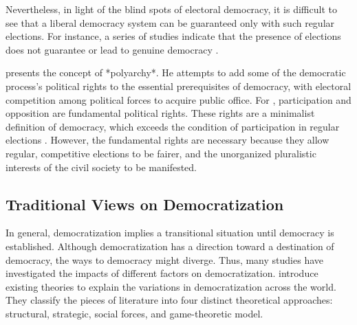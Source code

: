 \documentclass[11pt]{article}
\begin{document}
Nevertheless, in light of the blind spots of electoral democracy, it is difficult to see that a liberal democracy system can be guaranteed only with such regular elections. For instance, a series of studies indicate that the presence of elections does not guarantee or lead to genuine democracy \citep{Miller2015a, Miller2015b, Wahman2013, Levitsky2010, Hadenius2007}. 

\citet{Dahl1971} presents the concept of *polyarchy*. He attempts to add some of the democratic process's political rights to the essential prerequisites of democracy, with electoral competition among political forces to acquire public office. For \citet{Dahl1971}, participation and opposition are fundamental political rights. These rights are a minimalist definition of democracy, which exceeds the condition of participation in regular elections \citep{przeworski2000}. However, the fundamental rights are necessary because they allow regular, competitive elections to be fairer, and the unorganized pluralistic interests of the civil society to be manifested.

\subsection*{Traditional Views on Democratization}

In general, democratization implies a transitional situation until democracy is established. Although democratization has a direction toward a destination of democracy, the ways to democracy might diverge. Thus, many studies have investigated the impacts of different factors on democratization. \citet[71]{Bergschlosser2007ch2} introduce existing theories to explain the variations in democratization across the world. They classify the pieces of literature into four distinct theoretical approaches: structural, strategic, social forces, and game-theoretic model. 
\end{document}
